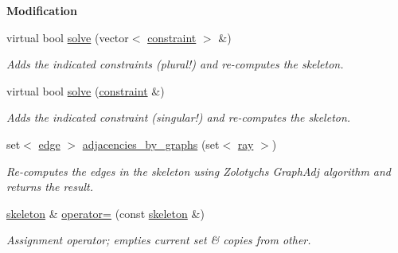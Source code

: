 \begin{Indent}\textbf{ Modification}\par
\begin{DoxyCompactItemize}
\item 
virtual bool \hyperlink{classskeleton_ac366952c2b0908159255916a1e37f9b3}{solve} (vector$<$ \hyperlink{classconstraint}{constraint} $>$ \&)
\begin{DoxyCompactList}\small\item\em Adds the indicated constraints (plural!) and re-\/computes the skeleton. \end{DoxyCompactList}\item 
virtual bool \hyperlink{classskeleton_a8add1433d3bc6b1a8588f0f88134599f}{solve} (\hyperlink{classconstraint}{constraint} \&)
\begin{DoxyCompactList}\small\item\em Adds the indicated constraint (singular!) and re-\/computes the skeleton. \end{DoxyCompactList}\item 
\mbox{\label{classskeleton_a1af8c607a3dc93633e0d395e73cb1c97}} 
set$<$ \hyperlink{classedge}{edge} $>$ \hyperlink{classskeleton_a1af8c607a3dc93633e0d395e73cb1c97}{adjacencies\+\_\+by\+\_\+graphs} (set$<$ \hyperlink{classray}{ray} $>$)
\begin{DoxyCompactList}\small\item\em Re-\/computes the edges in the skeleton using Zolotych\textquotesingle{}s {\ttfamily Graph\+Adj} algorithm and returns the result. \end{DoxyCompactList}\item 
\mbox{\label{classskeleton_aa5991e7e25783c2b8cfd772f41f7b99b}} 
\hyperlink{classskeleton}{skeleton} \& \hyperlink{classskeleton_aa5991e7e25783c2b8cfd772f41f7b99b}{operator=} (const \hyperlink{classskeleton}{skeleton} \&)
\begin{DoxyCompactList}\small\item\em Assignment operator; empties current set \& copies from other. \end{DoxyCompactList}\end{DoxyCompactItemize}
\end{Indent}
